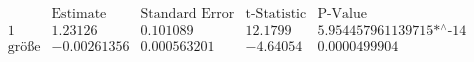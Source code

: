 \[\begin{array}{l|llll}
 \text{} & \text{Estimate} & \text{Standard Error} & \text{t-Statistic} & \text{P-Value} \\
\hline
 1 & 1.23126 & 0.101089 & 12.1799 & \text{5.954457961139715$\grave{ }$*${}^{\wedge}$-14} \\
 \text{gr{\" o}{\ss}e} & -0.00261356 & 0.000563201 & -4.64054 & 0.0000499904 \\
\end{array}\]


